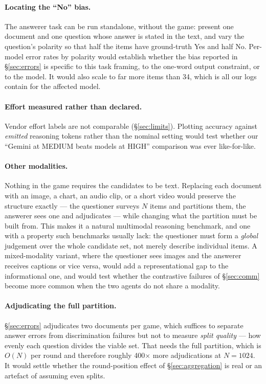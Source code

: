 \documentclass[11pt]{article}
\begin{document}
\paragraph{Locating the ``No'' bias.} The answerer task can be run standalone,
without the game: present one document and one question whose answer is stated
in the text, and vary the question's polarity so that half the items have
ground-truth Yes and half No. Per-model error rates by polarity would establish
whether the bias reported in \S\ref{sec:errors} is specific to this task
framing, to the one-word output constraint, or to the model. It would also
scale to far more items than 34, which is all our logs contain for the affected
model.

\paragraph{Effort measured rather than declared.} Vendor effort labels are not
comparable (\S\ref{sec:limits}). Plotting accuracy against \emph{emitted}
reasoning tokens rather than the nominal setting would test whether our
``Gemini at MEDIUM beats models at HIGH'' comparison was ever like-for-like.

\paragraph{Other modalities.} Nothing in the game requires the candidates to be
text. Replacing each document with an image, a chart, an audio clip, or a short
video would preserve the structure exactly --- the questioner surveys $N$ items
and partitions them, the answerer sees one and adjudicates --- while changing
what the partition must be built from. This makes it a natural multimodal
reasoning benchmark, and one with a property such benchmarks usually lack: the
questioner must form a \emph{global} judgement over the whole candidate set,
not merely describe individual items. A mixed-modality variant, where the
questioner sees images and the answerer receives captions or vice versa, would add a
representational gap to the informational one, and would test whether the
contrastive failures of \S\ref{sec:comm} become more common when the two agents
do not share a modality.

\paragraph{Adjudicating the full partition.} \S\ref{sec:errors} adjudicates two
documents per game, which suffices to separate answer errors from
discrimination failures but not to measure \emph{split quality} --- how evenly
each question divides the viable set. That needs the full partition, which is
$O(N)$ per round and therefore roughly 400$\times$ more adjudications at
$N{=}1024$. It would settle whether the round-position effect of
\S\ref{sec:aggregation} is real or an artefact of assuming even splits.
\end{document}
